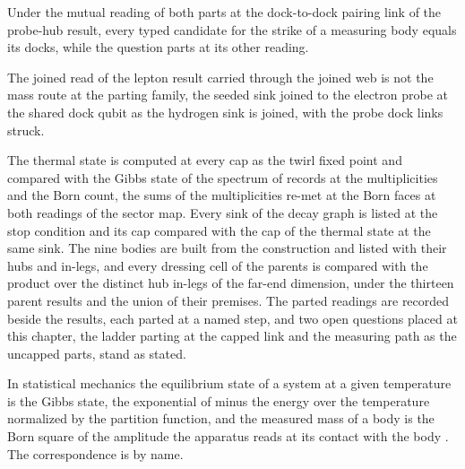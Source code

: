 \begin{chwall}\label{box:VIII-5-unified-mass-readout:4}
Under the mutual reading of both parts at the dock-to-dock pairing link of the probe-hub result, every typed candidate for the strike of a measuring body equals its docks, while the question parts at its other reading.
\end{chwall}
\begin{chwall}\label{box:VIII-5-unified-mass-readout:5}
The joined read of the lepton result carried through the joined web is not the mass route at the parting family, the seeded sink joined to the electron probe at the shared dock qubit as the hydrogen sink is joined, with the probe dock links struck.
\end{chwall}
The thermal state is computed at every cap as the twirl fixed point and compared with the Gibbs state of the spectrum of records at the multiplicities and the Born count, the sums of the multiplicities re-met at the Born faces at both readings of the sector map. Every sink of the decay graph is listed at the stop condition and its cap compared with the cap of the thermal state at the same sink. The nine bodies are built from the construction and listed with their hubs and in-legs, and every dressing cell of the parents is compared with the product over the distinct hub in-legs of the far-end dimension, under the thirteen parent results and the union of their premises. The parted readings are recorded beside the results, each parted at a named step, and two open questions placed at this chapter, the ladder parting at the capped link and the measuring path as the uncapped parts, stand as stated.
\begin{chbridge}
In statistical mechanics the equilibrium state of a system at a given temperature is the Gibbs state, the exponential of minus the energy over the temperature normalized by the partition function, and the measured mass of a body is the Born square of the amplitude the apparatus reads at its contact with the body \cite{Gibbs1902,Born1926}. The correspondence is by name.
\end{chbridge}
